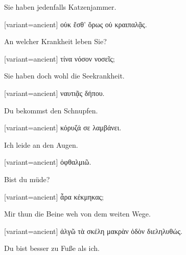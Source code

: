 Sie haben jedenfalls Katzenjammer.

\switchcolumn

\begin{greek}[variant=ancient]%
οὐκ ἔσθ' ὅρως οὐ κραιπαλᾷς.

\end{greek}%
\switchcolumn*

An welcher Krankheit leben Sie?

\switchcolumn

\begin{greek}[variant=ancient]%
τίνα νόσον νοσεῖς;

\end{greek}%
\switchcolumn*

Sie haben doch wohl die Seekrankheit.

\switchcolumn

\begin{greek}[variant=ancient]%
ναυτιᾷς δήπου.

\end{greek}%
\switchcolumn*

Du bekommst den Schnupfen.

\switchcolumn

\begin{greek}[variant=ancient]%
κόρυζά σε λαμβάνει.

\end{greek}%
\switchcolumn*

Ich leide an den Augen.

\switchcolumn

\begin{greek}[variant=ancient]%
ὀφθαλμιῶ.

\end{greek}%
\switchcolumn*

Bist du müde?

\switchcolumn

\begin{greek}[variant=ancient]%
ἆρα κέκμηκας;

\end{greek}%
\switchcolumn*

Mir thun die Beine weh von dem weiten Wege.

\switchcolumn

\begin{greek}[variant=ancient]%
ἀλγῶ τὰ σκέλη μακρὰν ὁδὸν διεληλυθώς.

\end{greek}%
\switchcolumn*

Du bist besser zu Fuße als ich.

